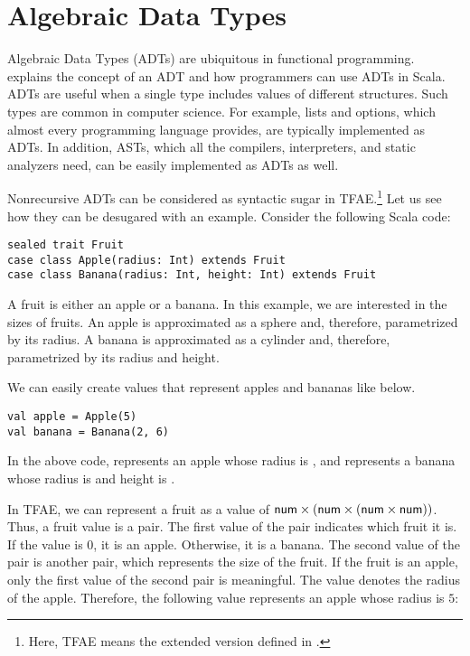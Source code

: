 
\chapter{Algebraic Data Types}

\renewcommand{\plang}{\textsf{TFAE}\xspace}
\renewcommand{\Lang}{\textsf{TVFAE}\xspace}

Algebraic Data Types (ADTs) are ubiquitous in functional programming.  explains
the concept of an ADT and how programmers can use ADTs in Scala. ADTs are useful
when a single type includes values of different structures. Such types are
common in computer science. For example, lists and options, which
almost every programming language provides, are typically implemented as ADTs. In addition, ASTs,
which all the compilers, interpreters, and static analyzers need, can be easily
implemented as ADTs as well.

Nonrecursive ADTs can be considered as syntactic sugar in
\plang.\footnote{Here, \plang means the extended version
defined in .}
Let us see how they can be desugared with an example. Consider the
following Scala code:

\begin{verbatim}
sealed trait Fruit
case class Apple(radius: Int) extends Fruit
case class Banana(radius: Int, height: Int) extends Fruit
\end{verbatim}

A fruit is either an apple or a banana. In this example, we are interested in
the sizes of fruits. An apple is approximated as a sphere and,
therefore, parametrized by its radius. A banana is approximated as a cylinder
and, therefore, parametrized by its radius and height.

We can easily create values that represent apples and bananas like below.

\begin{verbatim}
val apple = Apple(5)
val banana = Banana(2, 6)
\end{verbatim}

In the above code,  represents an apple whose radius is ,
and  represents a banana whose radius is  and height is
.

In \plang, we can represent a fruit as a value of
$\textsf{num}\times(\textsf{num}\times(\textsf{num}\times\textsf{num}))$. Thus, a fruit value is a pair.
The first value of the pair indicates which fruit it is. If the value is $0$,
it is an apple. Otherwise, it is a banana. The second value of the
pair is another pair, which represents the size of the fruit. If the fruit is an
apple, only the first value of the second pair is meaningful. The value denotes
the radius of the apple. Therefore, the following value represents an apple
whose radius is $5$:


